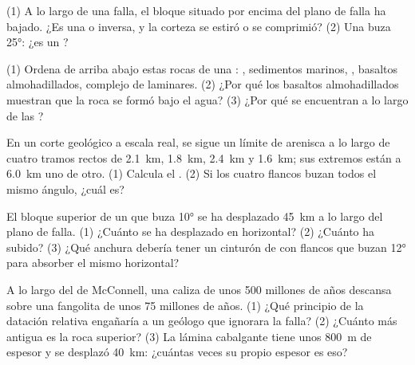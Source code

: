 \begin{exercise}[$\star$]\label{exo:g12:mountain-building:4}
(1) A lo largo de una falla, el bloque situado por encima del plano de falla
ha bajado. ¿Es una  o inversa, y la corteza se estiró o se
comprimió? (2) Una  buza \ang{25}: ¿es un ?
\end{exercise}

\begin{exercise}[$\star$]\label{exo:g12:mountain-building:5}
(1) Ordena de arriba abajo estas rocas de una : , sedimentos
marinos, , basaltos almohadillados, complejo de  laminares.
(2) ¿Por qué los basaltos almohadillados muestran que la roca se formó bajo el
agua? (3) ¿Por qué se encuentran  a lo largo de las ?
\end{exercise}

\begin{exercise}[$\star\star$]\label{exo:g12:mountain-building:6}
En un corte geológico a escala real, se sigue un límite de arenisca a lo
largo de cuatro tramos rectos de \qty{2.1}{km}, \qty{1.8}{km}, \qty{2.4}{km}
y \qty{1.6}{km}; sus extremos están a \qty{6.0}{km} uno de otro. (1) Calcula
el . (2) Si los cuatro flancos buzan todos el mismo ángulo,
¿cuál es?
\end{exercise}

\begin{exercise}[$\star\star$]\label{exo:g12:mountain-building:7}
El bloque superior de un  que buza \ang{10} se ha desplazado
\qty{45}{km} a lo largo del plano de falla. (1) ¿Cuánto se ha desplazado en
horizontal? (2) ¿Cuánto ha subido? (3) ¿Qué anchura debería tener un cinturón
de  con flancos que buzan \ang{12} para absorber el mismo
 horizontal?
\end{exercise}

\begin{exercise}[$\star\star$]\label{exo:g12:mountain-building:8}
A lo largo del  de McConnell, una caliza de unos 500 millones de
años descansa sobre una fangolita de unos 75 millones de años. (1) ¿Qué
principio de la datación relativa engañaría a un geólogo que ignorara la
falla? (2) ¿Cuánto más antigua es la roca superior? (3) La lámina cabalgante
tiene unos \qty{800}{m} de espesor y se desplazó \qty{40}{km}: ¿cuántas veces
su propio espesor es eso?
\end{exercise}

